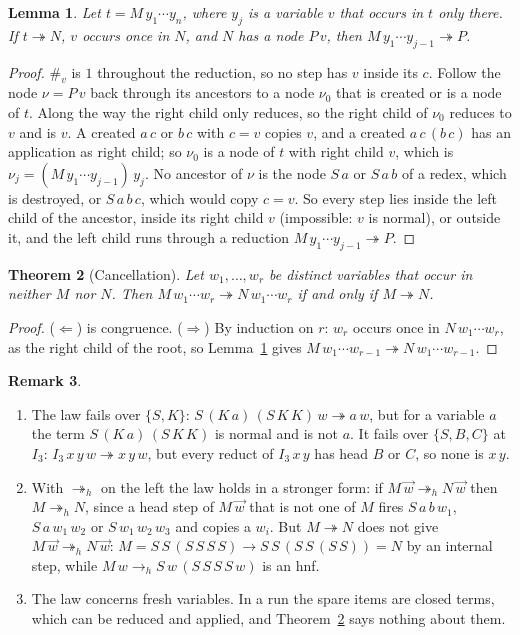 \documentclass[11pt]{amsart}
\newtheorem{theorem}{Theorem}
\newtheorem{lemma}[theorem]{Lemma}
\theoremstyle{definition}
\newtheorem{remark}[theorem]{Remark}
\newcommand{\red}{\twoheadrightarrow}
\newcommand{\hred}{\twoheadrightarrow_h}
\newcommand{\hstep}{\to_h}
\newcommand{\Ir}{I_3}
\newcommand{\vw}{\vec w}
\begin{document}
\begin{lemma}\label{lem:arg}
Let $t=M\,y_1\cdots y_n$, where $y_j$ is a variable $v$ that occurs in $t$ only there. If $t\red N$, $v$
occurs once in $N$, and $N$ has a node $P\,v$, then $M\,y_1\cdots y_{j-1}\red P$.
\end{lemma}

\begin{proof}
$\#_v$ is $1$ throughout the reduction, so no step has $v$ inside its $c$. Follow the node $\nu=P\,v$
back through its ancestors to a node $\nu_0$ that is created or is a node of $t$. Along the way the right
child only reduces, so the right child of $\nu_0$ reduces to $v$ and is $v$. A created $a\,c$ or $b\,c$
with $c=v$ copies $v$, and a created $a\,c\,(b\,c)$ has an application as right child; so $\nu_0$ is a node
of $t$ with right child $v$, which is $\nu_j=(M\,y_1\cdots y_{j-1})\,y_j$. No ancestor of $\nu$ is the
node $S\,a$ or $S\,a\,b$ of a redex, which is destroyed, or $S\,a\,b\,c$, which would copy $c=v$. So every
step lies inside the left child of the ancestor, inside its right child $v$ (impossible: $v$ is
normal), or outside it, and the left child runs through a reduction $M\,y_1\cdots y_{j-1}\red P$.
\end{proof}

\begin{theorem}[Cancellation]\label{thm:peel}
Let $w_1,\dots,w_r$ be distinct variables that occur in neither $M$ nor $N$. Then
$M\,w_1\cdots w_r\red N\,w_1\cdots w_r$ if and only if $M\red N$.
\end{theorem}

\begin{proof}
($\Leftarrow$) is congruence. ($\Rightarrow$) By induction on $r$: $w_r$ occurs once in
$N\,w_1\cdots w_r$, as the right child of the root, so Lemma~\ref{lem:arg} gives
$M\,w_1\cdots w_{r-1}\red N\,w_1\cdots w_{r-1}$.
\end{proof}

\begin{remark}\label{rem:peel}
\begin{enumerate}
\item[(i)] The law fails over $\{S,K\}$: $S\,(K\,a)\,(S\,K\,K)\,w\red a\,w$, but for a variable $a$ the
term $S\,(K\,a)\,(S\,K\,K)$ is normal and is not $a$. It fails over $\{S,B,C\}$ at $\Ir$:
$\Ir\,x\,y\,w\red x\,y\,w$, but every reduct of $\Ir\,x\,y$ has head $B$ or $C$, so none is $x\,y$.
\item[(ii)] With $\hred$ on the left the law holds in a stronger form: if $M\,\vw\hred N\,\vw$ then
$M\hred N$, since a head step of $M\,\vw$ that is not one of $M$ fires $S\,a\,b\,w_1$, $S\,a\,w_1\,w_2$ or
$S\,w_1\,w_2\,w_3$ and copies a $w_i$. But $M\red N$ does not give $M\,\vw\hred N\,\vw$:
$M=S\,S\,(S\,S\,S\,S)\to S\,S\,(S\,S\,(S\,S))=N$ by an internal step, while $M\,w\hstep S\,w\,(S\,S\,S\,S\,w)$
is an hnf.
\item[(iii)] The law concerns fresh variables. In a run the spare items are closed terms, which can be
reduced and applied, and Theorem~\ref{thm:peel} says nothing about them.
\end{enumerate}
\end{remark}
\end{document}
